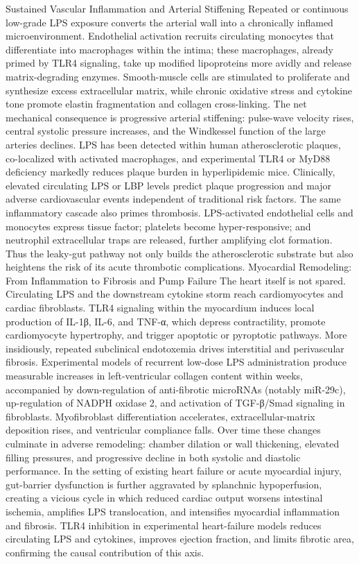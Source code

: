 Sustained Vascular Inflammation and Arterial Stiffening
Repeated or continuous low-grade LPS exposure converts the arterial wall into a chronically inflamed microenvironment. Endothelial activation recruits circulating monocytes that differentiate into macrophages within the intima; these macrophages, already primed by TLR4 signaling, take up modified lipoproteins more avidly and release matrix-degrading enzymes. Smooth-muscle cells are stimulated to proliferate and synthesize excess extracellular matrix, while chronic oxidative stress and cytokine tone promote elastin fragmentation and collagen cross-linking. The net mechanical consequence is progressive arterial stiffening: pulse-wave velocity rises, central systolic pressure increases, and the Windkessel function of the large arteries declines. LPS has been detected within human atherosclerotic plaques, co-localized with activated macrophages, and experimental TLR4 or MyD88 deficiency markedly reduces plaque burden in hyperlipidemic mice. Clinically, elevated circulating LPS or LBP levels predict plaque progression and major adverse cardiovascular events independent of traditional risk factors.
The same inflammatory cascade also primes thrombosis. LPS-activated endothelial cells and monocytes express tissue factor; platelets become hyper-responsive; and neutrophil extracellular traps are released, further amplifying clot formation. Thus the leaky-gut pathway not only builds the atherosclerotic substrate but also heightens the risk of its acute thrombotic complications.
Myocardial Remodeling: From Inflammation to Fibrosis and Pump Failure
The heart itself is not spared. Circulating LPS and the downstream cytokine storm reach cardiomyocytes and cardiac fibroblasts. TLR4 signaling within the myocardium induces local production of IL-1β, IL-6, and TNF-α, which depress contractility, promote cardiomyocyte hypertrophy, and trigger apoptotic or pyroptotic pathways. More insidiously, repeated subclinical endotoxemia drives interstitial and perivascular fibrosis. Experimental models of recurrent low-dose LPS administration produce measurable increases in left-ventricular collagen content within weeks, accompanied by down-regulation of anti-fibrotic microRNAs (notably miR-29c), up-regulation of NADPH oxidase 2, and activation of TGF-β/Smad signaling in fibroblasts. Myofibroblast differentiation accelerates, extracellular-matrix deposition rises, and ventricular compliance falls.
Over time these changes culminate in adverse remodeling: chamber dilation or wall thickening, elevated filling pressures, and progressive decline in both systolic and diastolic performance. In the setting of existing heart failure or acute myocardial injury, gut-barrier dysfunction is further aggravated by splanchnic hypoperfusion, creating a vicious cycle in which reduced cardiac output worsens intestinal ischemia, amplifies LPS translocation, and intensifies myocardial inflammation and fibrosis. TLR4 inhibition in experimental heart-failure models reduces circulating LPS and cytokines, improves ejection fraction, and limits fibrotic area, confirming the causal contribution of this axis.
